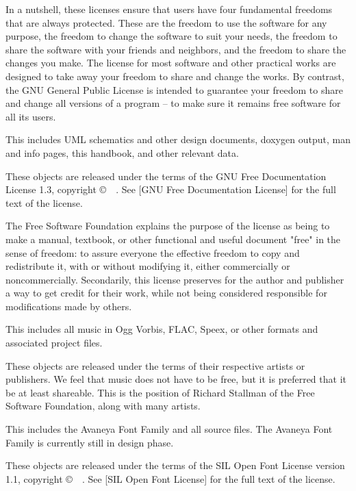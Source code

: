 In a nutshell, these licenses ensure that users have four fundamental freedoms that are always protected. These are the freedom to use the software for any purpose, the freedom to change the software to suit your needs, the freedom to share the software with your friends and neighbors, and the freedom to share the changes you make. The license for most software and other practical works are designed to take away your freedom to share and change the works. By contrast, the GNU General Public License is intended to guarantee your freedom to share and change all versions of a program -- to make sure it remains free software for all its users.


This includes UML schematics and other design documents, doxygen output, man and info pages, this handbook, and other relevant data.

These objects are released under the terms of the GNU Free Documentation License 1.3, copyright \copyright\ \CopyrightDates\ \CopyrightHolder. See [GNU Free Documentation License] for the full text of the license.

The Free Software Foundation explains the purpose of the license as being to make a manual, textbook, or other functional and useful document "free" in the sense of freedom: to assure everyone the effective freedom to copy and redistribute it, with or without modifying it, either commercially or noncommercially. Secondarily, this license preserves for the author and publisher a way to get credit for their work, while not being considered responsible for modifications made by others.


This includes all music in Ogg Vorbis, FLAC, Speex, or other formats and associated project files.

These objects are released under the terms of their respective artists or publishers. We feel that music does not have to be free, but it is preferred that it be at least shareable. This is the position of Richard Stallman of the Free Software Foundation, along with many artists.


This includes the Avaneya Font Family and all source files. The Avaneya Font Family is currently still in design phase.

These objects are released under the terms of the SIL Open Font License version 1.1, copyright \copyright\ \CopyrightDates\ \CopyrightHolder. See [SIL Open Font License] for the full text of the license.
\stopitemize

\StopChapter


